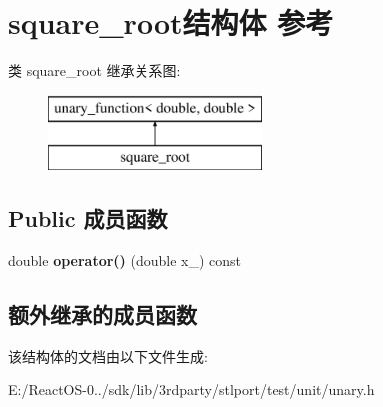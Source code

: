 \hypertarget{structsquare__root}{}\section{square\+\_\+root结构体 参考}
\label{structsquare__root}
类 square\+\_\+root 继承关系图\+:\begin{figure}[H]
\begin{center}
\leavevmode
\includegraphics[height=2.000000cm]{structsquare__root}
\end{center}
\end{figure}
\subsection*{Public 成员函数}
\begin{DoxyCompactItemize}
\item 
\mbox{\label{structsquare__root_a9979096703b1b7970f840d91b9ee2d83}} 
double {\bfseries operator()} (double x\+\_\+) const
\end{DoxyCompactItemize}
\subsection*{额外继承的成员函数}


该结构体的文档由以下文件生成\+:\begin{DoxyCompactItemize}
\item 
E\+:/\+React\+O\+S-\/0../sdk/lib/3rdparty/stlport/test/unit/unary.\+h\end{DoxyCompactItemize}
